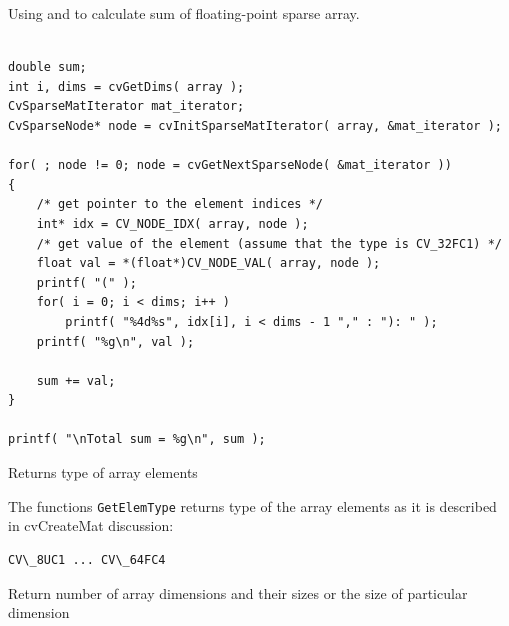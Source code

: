 Using  and  to calculate sum of floating-point sparse array.

\begin{lstlisting}

double sum;
int i, dims = cvGetDims( array );
CvSparseMatIterator mat_iterator;
CvSparseNode* node = cvInitSparseMatIterator( array, &mat_iterator );

for( ; node != 0; node = cvGetNextSparseNode( &mat_iterator ))
{
    /* get pointer to the element indices */
    int* idx = CV_NODE_IDX( array, node );
    /* get value of the element (assume that the type is CV_32FC1) */
    float val = *(float*)CV_NODE_VAL( array, node );
    printf( "(" );
    for( i = 0; i < dims; i++ )
        printf( "%4d%s", idx[i], i < dims - 1 "," : "): " );
    printf( "%g\n", val );

    sum += val;
}

printf( "\nTotal sum = %g\n", sum );

\end{lstlisting}


\label{GetElemType}

Returns type of array elements


\begin{description}
\end{description}


The functions \texttt{GetElemType} returns type of the array elements as it is described in cvCreateMat discussion:

\begin{lstlisting}
CV\_8UC1 ... CV\_64FC4
\end{lstlisting}


\label{GetDims, GetDimSize}

Return number of array dimensions and their sizes or the size of particular dimension


\begin{description}
\end{description}


